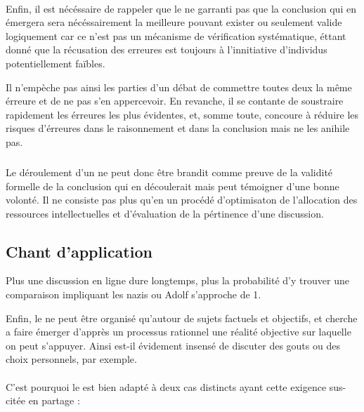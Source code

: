 \paragraph{}
Enfin, il est nécéssaire de rappeler que le \mainabbr{} ne garranti pas que la conclusion qui en émergera sera nécéssairement la meilleure pouvant exister ou seulement valide logiquement car ce n’est pas un mécanisme de vérification systématique, éttant donné que la récusation des erreures est toujours à l’innitiative d’individus potentiellement faïbles.

Il n’empèche pas ainsi les parties d’un débat de commettre toutes deux la même érreure et de ne pas s’en appercevoir. En revanche, il se contante de soustraire rapidement les érreures les plus évidentes, et, somme toute, concoure à réduire les risques d’érreures dans le raisonnement et dans la conclusion mais ne les anihile pas.

\subparagraph{}
Le déroulement d’un \mainabbr{} ne peut donc être brandit comme preuve de la validité formelle de la conclusion qui en découlerait mais peut témoigner d’une bonne volonté. Il ne consiste pas plus qu’en un procédé d’optimisaton de l’allocation des ressources intellectuelles et d’évaluation de la pértinence d’une discussion.

\subsection{Chant d’application}
\epigraph{Plus une discussion en ligne dure longtemps, plus la probabilité d’y trouver une comparaison impliquant les nazis ou Adolf  s’approche de 1.}{}
Enfin, le \mainabbr{} ne peut être organisé qu’autour de sujets factuels et objectifs, et cherche a faire émerger d’apprès un processus rationnel une réalité objective sur laquelle on peut s’appuyer. Ainsi est-il évidement insensé de discuter des gouts ou des choix personnels, par exemple.

\paragraph*{}
C’est pourquoi le \mainabbr{} est bien adapté à deux cas distincts ayant cette exigence sus-citée en partage :

